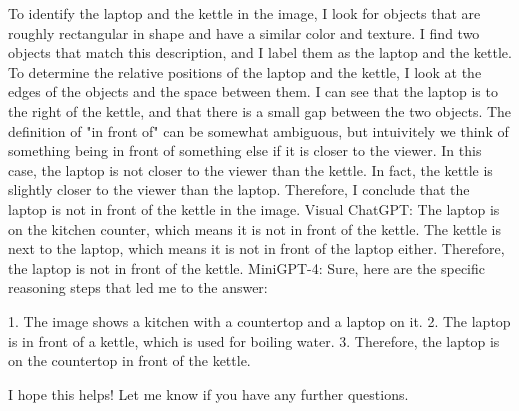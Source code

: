 \begin{enumerate}
    To identify the laptop and the kettle in the image, I look for objects that are roughly rectangular in shape and have a similar color and texture. I find two objects that match this description, and I label them as the laptop and the kettle.
    To determine the relative positions of the laptop and the kettle, I look at the edges of the objects and the space between them. I can see that the laptop is to the right of the kettle, and that there is a small gap between the two objects.
    The definition of "in front of" can be somewhat ambiguous, but intuivitely we think of something being in front of something else if it is closer to the viewer. In this case, the laptop is not closer to the viewer than the kettle. In fact, the kettle is slightly closer to the viewer than the laptop.
    Therefore, I conclude that the laptop is not in front of the kettle in the image.
    \subitem Visual ChatGPT: The laptop is on the kitchen counter, which means it is not in front of the kettle. The kettle is next to the laptop, which means it is not in front of the laptop either. Therefore, the laptop is not in front of the kettle.
    \subitem MiniGPT-4: Sure, here are the specific reasoning steps that led me to the answer:

    1. The image shows a kitchen with a countertop and a laptop on it.
    2. The laptop is in front of a kettle, which is used for boiling water.
    3. Therefore, the laptop is on the countertop in front of the kettle.
    
    I hope this helps! Let me know if you have any further questions.
\end{enumerate}
